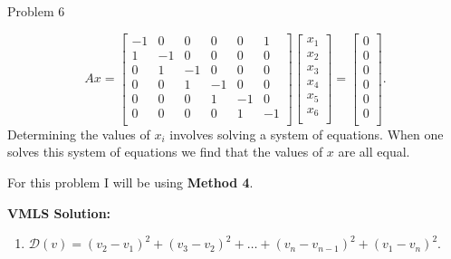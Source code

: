 \begin{problem}{Problem 6}
\begin{highlight}
\begin{enumerate}[label = (\alph*), start = 2]
            \begin{equation}
                Ax = 
                \begin{bmatrix}
                    -1 & 0 & 0 & 0 & 0 & 1 \\
                    1 & -1 & 0 & 0 & 0 & 0 \\
                    0 & 1 & -1 & 0 & 0 & 0 \\
                    0 & 0 & 1 & -1 & 0 & 0 \\
                    0 & 0 & 0 & 1 & -1 & 0 \\
                    0 & 0 & 0 & 0 & 1 & -1 \\
                \end{bmatrix}
                \begin{bmatrix}
                    x_{1} \\
                    x_{2} \\
                    x_{3} \\
                    x_{4} \\
                    x_{5} \\
                    x_{6} \\
                \end{bmatrix}
                = 
                \begin{bmatrix}
                    0 \\
                    0 \\
                    0 \\
                    0 \\
                    0 \\
                    0 \\
                \end{bmatrix}.
            \end{equation}
            Determining the values of $x_{i}$ involves solving a system of equations. When one solves this system of equations we find that the values of $x$ are all equal.
        \end{enumerate}
    \end{highlight}

    \begin{highlight}
        For this problem I will be using \textbf{Method 4}. \vspace*{1em}

        \noindent \textbf{VMLS Solution:} 

        \begin{enumerate}[label = (\alph*), start = 3]
            \item $\mathcal{D}(v) = (v_{2} - v_{1})^{2} + (v_{3} - v_{2})^{2} + \dots + (v_{n} - v_{n - 1})^{2} + (v_{1} - v_{n})^{2}.$
        \end{enumerate}


\end{highlight}
\end{problem}
